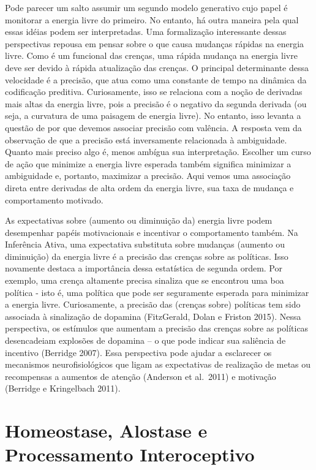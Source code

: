 \documentclass[
  12pt,
]{book}
\begin{document}
Pode parecer um salto assumir um segundo modelo generativo cujo papel é monitorar a energia livre do primeiro. No entanto, há outra maneira pela qual essas idéias podem ser interpretadas. Uma formalização interessante dessas perspectivas repousa em pensar sobre o que causa mudanças rápidas na energia livre. Como é um funcional das crenças, uma rápida mudança na energia livre deve ser devido à rápida atualização das crenças. O principal determinante dessa velocidade é a precisão, que atua como uma constante de tempo na dinâmica da codificação preditiva. Curiosamente, isso se relaciona com a noção de derivadas mais altas da energia livre, pois a precisão é o negativo da segunda derivada (ou seja, a curvatura de uma paisagem de energia livre). No entanto, isso levanta a questão de por que devemos associar precisão com valência. A resposta vem da observação de que a precisão está inversamente relacionada à ambiguidade. Quanto mais preciso algo é, menos ambígua sua interpretação. Escolher um curso de ação que minimize a energia livre esperada também significa minimizar a ambiguidade e, portanto, maximizar a precisão. Aqui vemos uma associação direta entre derivadas de alta ordem da energia livre, sua taxa de mudança e comportamento motivado.

As expectativas sobre (aumento ou diminuição da) energia livre podem desempenhar papéis motivacionais e incentivar o comportamento também. Na Inferência Ativa, uma expectativa substituta sobre mudanças (aumento ou diminuição) da energia livre é a precisão das crenças sobre as políticas. Isso novamente destaca a importância dessa estatística de segunda ordem. Por exemplo, uma crença altamente precisa sinaliza que se encontrou uma boa política - isto é, uma política que pode ser seguramente esperada para minimizar a energia livre. Curiosamente, a precisão das (crenças sobre) políticas tem sido associada à sinalização de dopamina (FitzGerald, Dolan e Friston 2015). Nessa perspectiva, os estímulos que aumentam a precisão das crenças sobre as políticas desencadeiam explosões de dopamina -- o que pode indicar sua saliência de incentivo (Berridge 2007). Essa perspectiva pode ajudar a esclarecer os mecanismos neurofisiológicos que ligam as expectativas de realização de metas ou recompensas a aumentos de atenção (Anderson et al.~2011) e motivação (Berridge e Kringelbach 2011).

\hypertarget{homeostase-alostase-e-processamento-interoceptivo}{%
\section{Homeostase, Alostase e Processamento Interoceptivo}\label{homeostase-alostase-e-processamento-interoceptivo}}
\end{document}
